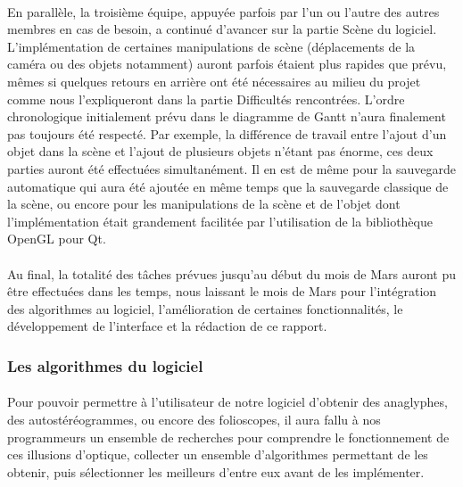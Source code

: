 \paragraph{}
En parallèle, la troisième équipe, appuyée parfois par l'un ou l'autre des autres membres en cas de besoin, a continué d'avancer sur la partie Scène du logiciel. L'implémentation de certaines manipulations de scène (déplacements de la caméra ou des objets notamment) auront parfois étaient plus rapides que prévu, mêmes si quelques retours en arrière ont été nécessaires au milieu du projet comme nous l'expliqueront dans la partie Difficultés rencontrées. L'ordre chronologique initialement prévu dans le diagramme de Gantt n'aura finalement pas toujours été respecté. Par exemple, la différence de travail entre l'ajout d'un objet dans la scène et l'ajout de plusieurs objets n'étant pas énorme, ces deux parties auront été effectuées simultanément. Il en est de même pour la sauvegarde automatique qui aura été ajoutée en même temps que la sauvegarde classique de la scène, ou encore pour les manipulations de la scène et de l'objet dont l'implémentation était grandement facilitée par l'utilisation de la bibliothèque OpenGL pour Qt.

\paragraph{}
Au final, la totalité des tâches prévues jusqu'au début du mois de Mars auront pu être effectuées dans les temps, nous laissant le mois de Mars pour l'intégration des algorithmes au logiciel, l'amélioration de certaines fonctionnalités, le développement de l'interface et la rédaction de ce rapport.



\subsubsection{Les algorithmes du logiciel}
\paragraph{}
Pour pouvoir permettre à l'utilisateur de notre logiciel d'obtenir des anaglyphes, des autostéréogrammes, ou encore des folioscopes, il aura fallu à nos programmeurs un ensemble de recherches pour comprendre le fonctionnement de ces illusions d'optique, collecter un ensemble d'algorithmes permettant de les obtenir, puis sélectionner les meilleurs d'entre eux avant de les implémenter.

